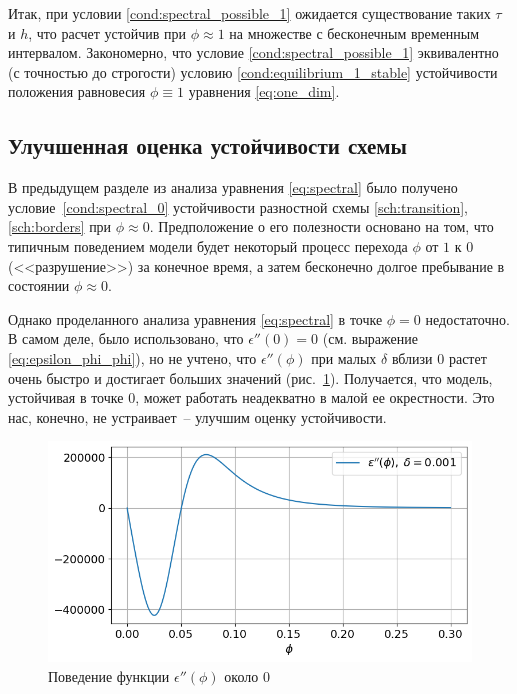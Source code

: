 Итак, при условии \eqref{cond:spectral_possible_1} ожидается существование таких $\tau$ и $h$, что расчет устойчив при $\phi \approx 1$ на множестве с бесконечным временным интервалом. Закономерно, что условие \eqref{cond:spectral_possible_1} эквивалентно (с точностью до строгости) условию \eqref{cond:equilibrium_1_stable} устойчивости положения равновесия $\phi \equiv 1$ уравнения \eqref{eq:one_dim}.


\subsection{Улучшенная оценка устойчивости схемы}

В предыдущем разделе из анализа уравнения \eqref{eq:spectral} было получено условие~\eqref{cond:spectral_0} устойчивости разностной схемы \eqref{sch:transition}, \eqref{sch:borders} при $\phi \approx 0$. Предположение о его полезности основано на том, что типичным поведением модели будет некоторый процесс перехода $\phi$ от $1$ к $0$ (<<разрушение>>) за конечное время, а затем бесконечно долгое пребывание в состоянии $\phi \approx 0$.

Однако проделанного анализа уравнения \eqref{eq:spectral} в точке $\phi = 0$ недостаточно. В самом деле, было использовано, что $\epsilon''(0) = 0$ (см. выражение \eqref{eq:epsilon_phi_phi}), но не учтено, что $\epsilon''(\phi)$ при малых $\delta$ вблизи $0$ растет очень быстро и достигает больших значений (рис.~\ref{fig:eps_phi_phi}). Получается, что модель, устойчивая в точке $0$, может работать неадекватно в малой ее окрестности. Это нас, конечно, не устраивает~-- улучшим оценку устойчивости.

\begin{figure}[!t]
	\centering
	\includegraphics[width=\textwidth]{figures/eps_phi_phi.png}
	\vspace{-0.7cm}
	\caption{Поведение функции $\epsilon''(\phi)$ около $0$}
	\label{fig:eps_phi_phi}
\end{figure}

